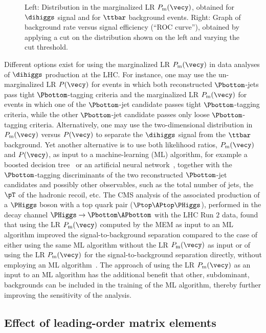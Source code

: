 \begin{figure}
\fi
\caption{
  Left: Distribution in the marginalized LR $P_{\textrm{m}}(\vecy)$, obtained for $\dihiggs$ signal and for $\ttbar$ background events.
  Right: Graph of background rate versus signal efficiency (``ROC curve''), obtained by applying a cut on the distribution shown on the left
  and varying the cut threshold.
}
\label{fig:memLR_and_ROC_missingBJet}
\end{figure}

Different options exist for using the marginalized LR $P_{\textrm{m}}(\vecy)$ in data analyses of $\dihiggs$ production at the LHC.
For instance, one may use the un-marginalized LR $P(\vecy)$ for events in which both reconstructed $\Pbottom$-jets pass tight $\Pbottom$-tagging criteria
and the marginalized LR $P_{\textrm{m}}(\vecy)$ for events in which one of the $\Pbottom$-jet candidate passes tight $\Pbottom$-tagging criteria,
while the other $\Pbottom$-jet candidate passes only loose $\Pbottom$-tagging criteria.
Alternatively, one may use the two-dimensional distribution in $P_{\textrm{m}}(\vecy)$ versus $P(\vecy)$ to separate the $\dihiggs$ signal from the $\ttbar$ background.
Yet another alternative is to use both likelihood ratios, $P_{\textrm{m}}(\vecy)$ and $P(\vecy)$,
as input to a machine-learning (ML) algorithm, for example a boosted decision tree~\cite{BDT} or an artificial neural network~\cite{ANN,chollet2015keras},
together with the $\Pbottom$-tagging discriminants of the two reconstructed $\Pbottom$-jet candidates and possibly other observables,
such as the total number of jets, the $\pT$ of the hadronic recoil, etc.
The CMS analysis of the associated production of a $\PHiggs$ boson with a top quark pair ($\Ptop\APtop\PHiggs$),
performed in the decay channel $\PHiggs \to \Pbottom\APbottom$ with the LHC Run $2$ data,
found that using the LR $P_{\textrm{m}}(\vecy)$ computed by the MEM as input to an ML algorithm
improved the signal-to-background separation compared to the case of either using the same ML algorithm without the LR $P_{\textrm{m}}(\vecy)$ as input
or of using the LR $P_{\textrm{m}}(\vecy)$ for the signal-to-background separation directly, without employing an ML algorithm~\cite{Sirunyan:2018mvw}.
The approach of using the LR $P_{\textrm{m}}(\vecy)$ as an input to an ML algorithm has the additional benefit
that other, subdominant, backgrounds can be included in the training of the ML algorithm, thereby further improving the sensitivity of the analysis.


\subsection{Effect of leading-order matrix elements}

